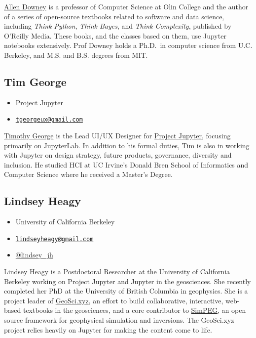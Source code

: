 \documentclass[]{book}
\providecommand{\tightlist}{%
  \setlength{\itemsep}{0pt}\setlength{\parskip}{0pt}}
\begin{document}
\href{http://www.allendowney.com/wp/}{Allen Downey} is a professor of
Computer Science at Olin College and the author of a series of
open-source textbooks related to software and data science, including
\emph{Think Python}, \emph{Think Bayes}, and \emph{Think Complexity},
published by O'Reilly Media. These books, and the classes based on them,
use Jupyter notebooks extensively. Prof Downey holds a Ph.D.~in computer
science from U.C. Berkeley, and M.S. and B.S. degrees from MIT.

\subsection{Tim George}\label{tim-george}

\begin{itemize}
\tightlist
\item
  Project Jupyter
\item
  \href{mailto:tgeorgeux@gmail.com}{\nolinkurl{tgeorgeux@gmail.com}}
\end{itemize}

\href{https://www.tgeorgeux.com/}{Timothy George} is the Lead UI/UX
Designer for \href{https://jupyter.org/}{Project Jupyter}, focusing
primarily on JupyterLab. In addition to his formal duties, Tim is also
in working with Jupyter on design strategy, future products, governance,
diversity and inclusion. He studied HCI at UC Irvine's Donald Bren
School of Informatics and Computer Science where he received a Master's
Degree.

\subsection{Lindsey Heagy}\label{lindsey-heagy}

\begin{itemize}
\tightlist
\item
  University of California Berkeley
\item
  \href{mailto:lindseyheagy@gmail.com}{\nolinkurl{lindseyheagy@gmail.com}}
\item
  \href{https://twitter.com/lindsey_jh}{@lindsey\_jh}
\end{itemize}

\href{https://www.lindseyjh.ca/}{Lindsey Heagy} is a Postdoctoral
Researcher at the University of California Berkeley working on Project
Jupyter and Jupyter in the geosciences. She recently completed her PhD
at the University of British Columbia in geophysics. She is a project
leader of \href{http://geosci.xyz}{GeoSci.xyz}, an effort to build
collaborative, interactive, web-based textbooks in the geosciences, and
a core contributor to \href{https://www.simpeg.xyz/}{SimPEG}, an open
source framework for geophysical simulation and inversions. The
GeoSci.xyz project relies heavily on Jupyter for making the content come
to life.
\end{document}
